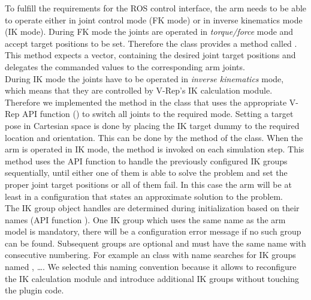 To fulfill the requirements for the ROS control interface, the arm needs to be able to operate either in joint control mode (FK mode) or in inverse kinematics mode (IK mode). During FK mode the joints are operated in \emph{torque/force} mode and accept target positions to be set. Therefore the  class provides a method called . This method expects a vector, containing the desired joint target positions and delegates the commanded values to the corresponding arm joints. \\

During IK mode the joints have to be operated in \emph{inverse kinematics} mode, which means that they are controlled by V-Rep's IK calculation module. Therefore we implemented the method  in the  class that uses the appropriate V-Rep API function () to switch all joints to the required mode. Setting a target pose in Cartesian space is done by placing the IK target dummy to the required location and orientation. This can be done by the method  of the  class. When the arm is operated in IK mode, the method  is invoked on each simulation step. This method uses the API function  to handle the previously configured IK groups sequentially, until either one of them is able to solve the problem and set the proper joint target positions or all of them fail. In this case the arm will be at least in a configuration that states an approximate solution to the problem. \\

The IK group object handles are determined during initialization based on their names (API function ). One IK group which uses the same name as the arm model is mandatory, there will be a configuration error message if no such group can be found. Subsequent groups are optional and must have the same name with consecutive numbering. For example an  class with name  searches for IK groups named , \ldots. We selected this naming convention because it allows to reconfigure the IK calculation module and introduce additional IK groups without touching the plugin code. \\

